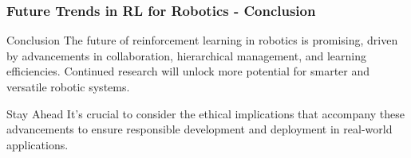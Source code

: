 \documentclass{beamer}
\begin{document}
\begin{frame}[fragile]
    \frametitle{Future Trends in RL for Robotics - Conclusion}
    \begin{block}{Conclusion}
        The future of reinforcement learning in robotics is promising, driven by advancements in collaboration, hierarchical management, and learning efficiencies. Continued research will unlock more potential for smarter and versatile robotic systems.
    \end{block}
    \begin{block}{Stay Ahead}
        It's crucial to consider the ethical implications that accompany these advancements to ensure responsible development and deployment in real-world applications.
    \end{block}
\end{frame}
\end{document}
